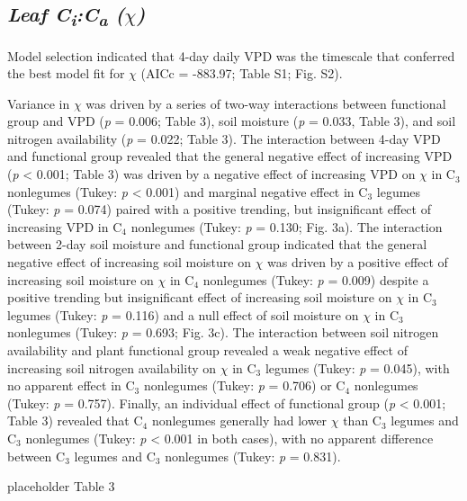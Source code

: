 \subsection{\textit{Leaf C\textsubscript{i}:C\textsubscript{a} ($\chi$)}}
Model selection indicated that 4-day daily VPD was the timescale that conferred the best model fit for $\chi$ (AICc = -883.97; Table S1; Fig. S2).

Variance in $\chi$ was driven by a series of two-way interactions between functional group and VPD (\textit{p} = 0.006; Table 3), soil moisture (\textit{p} = 0.033, Table 3), and soil nitrogen availability (\textit{p} = 0.022; Table 3). The interaction between 4-day VPD and functional group revealed that the general negative effect of increasing VPD (\textit{p} < 0.001; Table 3) was driven by a negative effect of increasing VPD on $\chi$ in C$_3$ nonlegumes (Tukey: \textit{p} < 0.001) and marginal negative effect in C$_3$ legumes (Tukey: \textit{p} = 0.074) paired with a positive trending, but insignificant effect of increasing VPD in C$_4$ nonlegumes (Tukey: \textit{p} = 0.130; Fig. 3a). The interaction between 2-day soil moisture and functional group indicated that the general negative effect of increasing soil moisture on $\chi$ was driven by a positive effect of increasing soil moisture on $\chi$ in C$_4$ nonlegumes (Tukey: \textit{p} = 0.009) despite a positive trending but insignificant effect of increasing soil moisture on $\chi$ in C$_3$ legumes (Tukey: \textit{p} = 0.116) and a null effect of soil moisture on $\chi$ in C$_3$ nonlegumes (Tukey: \textit{p} = 0.693; Fig. 3c). The interaction between soil nitrogen availability and plant functional group revealed a weak negative effect of increasing soil nitrogen availability on $\chi$ in C$_3$ legumes (Tukey: \textit{p} = 0.045), with no apparent effect in C$_3$ nonlegumes (Tukey: \textit{p} = 0.706) or C$_4$ nonlegumes (Tukey: \textit{p} = 0.757). Finally, an individual effect of functional group (\textit{p} < 0.001; Table 3) revealed that C$_4$ nonlegumes generally had lower $\chi$ than C$_3$ legumes and C$_3$ nonlegumes (Tukey: \textit{p} < 0.001 in both cases), with no apparent difference between C$_3$ legumes and C$_3$ nonlegumes (Tukey: \textit{p} = 0.831).

\newpage
placeholder Table 3
\clearpage

